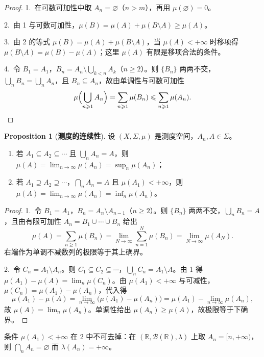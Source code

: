 \documentclass[oneside]{book}
\theoremstyle{definition}
\newcommand{\R}{\mathbb{R}}
\theoremstyle{definition}
\newtheorem{proposition}{Proposition}[section]
\begin{document}
	\begin{proof}
		1.\ 在可数可加性中取 $A_n=\varnothing$（$n>m$），再用 $\mu(\varnothing)=0$。
		
		2.\ 由 1 与可数可加性，$\mu(B)=\mu(A)+\mu(B\setminus A)\geqslant\mu(A)$。
		
		3.\ 由 2 的等式 $\mu(B)=\mu(A)+\mu(B\setminus A)$，当 $\mu(A)<+\infty$ 时移项得 $\mu(B\setminus A)=\mu(B)-\mu(A)$；这里 $\mu(A)$ 有限是移项合法的条件。
		
		4.\ 令 $B_1=A_1$，$B_n=A_n\setminus\bigcup_{k<n}A_k$（$n\geqslant2$）。则 $\{B_n\}$ 两两不交，$\bigcup_n B_n=\bigcup_n A_n$，且 $B_n\subseteq A_n$，故由单调性与可数可加性
		\[
		\mu\Bigl(\bigcup_{n\geqslant1}A_n\Bigr)=\sum_{n\geqslant1}\mu(B_n)\leqslant\sum_{n\geqslant1}\mu(A_n).\qedhere
		\]
	\end{proof}
	
	\begin{proposition}[\bfseries{测度的连续性}]
		设 $(X,\Sigma,\mu)$ 是测度空间，$A_n,A\in\Sigma$。
		\begin{enumerate}
			\item 若 $A_1\subseteq A_2\subseteq\cdots$ 且 $\bigcup_n A_n=A$，则 $\mu(A)=\lim_{n\to\infty}\mu(A_n)=\sup_n\mu(A_n)$；
			\item 若 $A_1\supseteq A_2\supseteq\cdots$，$\bigcap_n A_n=A$ 且 $\mu(A_1)<+\infty$，则 $\mu(A)=\lim_{n\to\infty}\mu(A_n)=\inf_n\mu(A_n)$。
		\end{enumerate}
	\end{proposition}
	
	\begin{proof}
		1.\ 令 $B_1=A_1$，$B_n=A_n\setminus A_{n-1}$（$n\geqslant2$）。则 $\{B_n\}$ 两两不交，$\bigcup_n B_n=A$，且由有限可加性 $A_n=B_1\cup\cdots\cup B_n$ 给出
		\[
		\mu(A)=\sum_{n\geqslant1}\mu(B_n)=\lim_{N\to\infty}\sum_{n=1}^{N}\mu(B_n)=\lim_{N\to\infty}\mu(A_N).
		\]
		右端作为单调不减数列的极限等于其上确界。
		
		2.\ 令 $C_n=A_1\setminus A_n$。则 $C_1\subseteq C_2\subseteq\cdots$，$\bigcup_n C_n=A_1\setminus A$。由 1 得 $\mu(A_1)-\mu(A)=\lim_n\mu(C_n)$。由 $\mu(A_1)<+\infty$ 与可减性，$\mu(C_n)=\mu(A_1)-\mu(A_n)$，代入得
		\[
		\mu(A_1)-\mu(A)=\lim_{n\to\infty}\bigl(\mu(A_1)-\mu(A_n)\bigr)=\mu(A_1)-\lim_{n\to\infty}\mu(A_n),
		\]
		故 $\mu(A)=\lim_n\mu(A_n)$。单调性给出 $\mu(A_n)\geqslant\mu(A)$，故极限等于下确界。
	\end{proof}
	
	条件 $\mu(A_1)<+\infty$ 在 2 中不可去掉：在 $(\R,\mathcal{B}(\R),\lambda)$ 上取 $A_n=[n,+\infty)$，则 $\bigcap_n A_n=\varnothing$ 而 $\lambda(A_n)=+\infty$。
	
\end{document}
